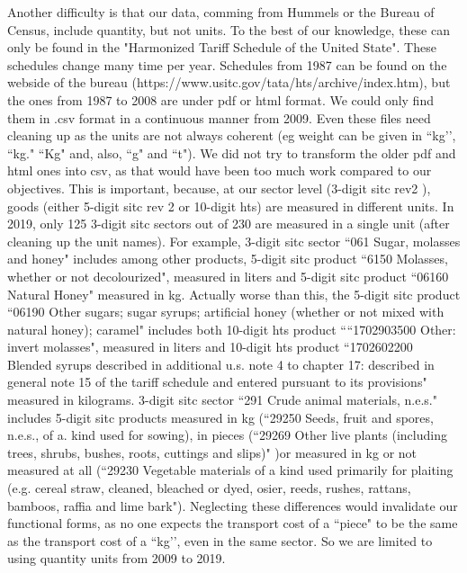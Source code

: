 \documentclass[a4paper,11pt]{article}
\begin{document}
Another difficulty is that our data, comming from Hummels or the Bureau of Census, include quantity, but not units.
To the best of our knowledge, these can only be found in the "Harmonized Tariff Schedule of the United State".
These schedules change many time per year.
Schedules from 1987 can be found on the webside of the bureau (https://www.usitc.gov/tata/hts/archive/index.htm), but the ones from 1987 to 2008 are under pdf or html format.
We could only find them in .csv format in a continuous manner from 2009.
Even these files need cleaning up as the units are not always coherent (eg weight can be given in ``kg’’, ``kg." ``Kg" and, also, ``g" and ``t").
We did not try to transform the older pdf and html ones into csv, as that would have been too much work compared to our objectives.
This is important, because, at our sector level (3-digit  sitc rev2 ), goods (either 5-digit sitc rev 2 or 10-digit hts) are measured in different units.
In 2019, only 125 3-digit sitc sectors out of 230 are measured in a single unit (after cleaning up the unit names).
For example, 3-digit sitc sector ``061 Sugar, molasses and honey" includes among other products, 5-digit sitc product ``6150 Molasses, whether or not decolourized", measured in liters and 5-digit sitc product ``06160 Natural Honey" measured in kg.
Actually worse than this, the 5-digit sitc product ``06190 Other sugars; sugar syrups; artificial honey (whether or not mixed with natural honey); caramel" includes both 10-digit hts product ````1702903500 Other: invert molasses", measured in liters and 10-digit hts product ``1702602200 Blended syrups described in additional u.s. note 4 to chapter 17: described in general note 15 of the tariff schedule and entered pursuant to its provisions"  measured in kilograms.
3-digit sitc sector ``291 Crude animal materials, n.e.s." includes 5-digit sitc products measured in kg (``29250 Seeds, fruit and spores, n.e.s., of a. kind used for sowing), in pieces (``29269 Other live plants (including trees, shrubs, bushes, roots, cuttings and slips)" )or measured in kg or not measured at all (``29230 Vegetable materials of a kind used primarily for plaiting (e.g. cereal straw, cleaned, bleached or dyed, osier, reeds, rushes, rattans, bamboos, raffia and lime bark").
Neglecting these differences would invalidate our functional forms, as no one expects the transport cost of a ``piece" to be the same as the transport cost of a ``kg’’, even in the same sector.
So we are limited to using quantity units from 2009 to 2019.
\end{document}
